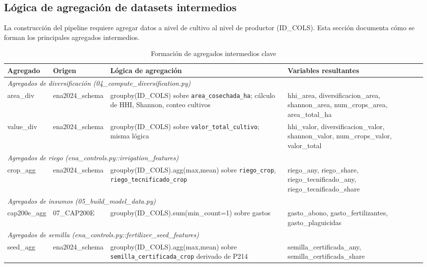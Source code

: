 \documentclass[11pt,a4paper]{article}
\begin{document}
\subsection{Lógica de agregación de datasets intermedios}

La construcción del pipeline requiere agregar datos a nivel de cultivo al nivel de productor (ID\_COLS). Esta sección documenta cómo se forman los principales agregados intermedios.

\begin{table}[H]
\centering
\caption{Formación de agregados intermedios clave}
\label{tab:aggregation_logic}
\begin{threeparttable}
\footnotesize
\begin{tabular}{p{2.8cm}p{2.5cm}p{4cm}p{4cm}}
\toprule
\textbf{Agregado} & \textbf{Origen} & \textbf{Lógica de agregación} & \textbf{Variables resultantes} \\
\midrule
\multicolumn{4}{l}{\textit{Agregados de diversificación (04\_compute\_diversification.py)}} \\
area\_div & ena2024\_schema & groupby(ID\_COLS) sobre \texttt{area\_cosechada\_ha}; cálculo de HHI, Shannon, conteo cultivos & hhi\_area, diversificacion\_area, shannon\_area, num\_crops\_area, area\_total\_ha \\
value\_div & ena2024\_schema & groupby(ID\_COLS) sobre \texttt{valor\_total\_cultivo}; misma lógica & hhi\_valor, diversificacion\_valor, shannon\_valor, num\_crops\_valor, valor\_total \\
\midrule
\multicolumn{4}{l}{\textit{Agregados de riego (ena\_controls.py::irrigation\_features)}} \\
crop\_agg & ena2024\_schema & groupby(ID\_COLS).agg(max,mean) sobre \texttt{riego\_crop}, \texttt{riego\_tecnificado\_crop} & riego\_any, riego\_share, riego\_tecnificado\_any, riego\_tecnificado\_share \\
\midrule
\multicolumn{4}{l}{\textit{Agregados de insumos (05\_build\_model\_data.py)}} \\
cap200e\_agg & 07\_CAP200E & groupby(ID\_COLS).sum(min\_count=1) sobre gastos & gasto\_abono, gasto\_fertilizantes, gasto\_plaguicidas \\
\midrule
\multicolumn{4}{l}{\textit{Agregados de semilla (ena\_controls.py::fertilizer\_seed\_features)}} \\
seed\_agg & ena2024\_schema & groupby(ID\_COLS).agg(max,mean) sobre \texttt{semilla\_certificada\_crop} derivado de P214 & semilla\_certificada\_any, semilla\_certificada\_share \\

\end{tabular}
\end{threeparttable}
\end{table}
\end{document}
